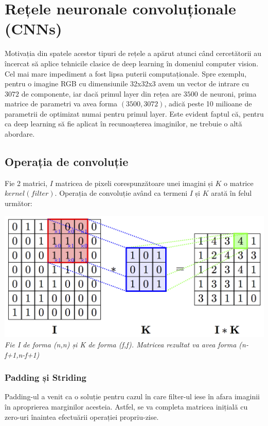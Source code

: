 \section{Rețele neuronale convoluționale (CNNs)}

Motivația din spatele acestor tipuri de rețele a apărut atunci când cercetătorii au încercat să aplice tehnicile clasice de deep learning în domeniul computer vision. Cel mai mare impediment a fost lipsa puterii computaționale. Spre exemplu, pentru o imagine RGB cu dimensiunile 32x32x3 avem un vector de intrare cu $3072$ de componente, iar dacă primul layer din rețea are $3500$ de neuroni, prima matrice de parametri va avea forma $(3500, 3072)$, adică peste 10 milioane de parametrii de optimizat numai pentru primul layer. Este evident faptul că, pentru ca deep learning să fie aplicat în recunoașterea imaginilor, ne trebuie o altă abordare.

\subsection{Operația de convoluție}
Fie 2 matrici, $I$ matricea de pixeli corespunzătoare unei imagini și $K$ o matrice $kernel (filter)$. Operația de convoluție având ca termeni $I$ și $K$ arată în felul următor:

\begin{center}
\includegraphics[scale=1.5]{convolution} \\
\textit{Fie I de forma (n,n) și K de forma (f,f). Matricea rezultat va avea forma (n-f+1,n-f+1)}
\end{center}


\subsubsection{Padding și Striding}
Padding-ul a venit ca o soluție pentru cazul în care filter-ul iese în afara imaginii în aproprierea marginilor acesteia. Astfel, se va completa matricea inițială cu zero-uri înaintea efectuării operației propriu-zise.

